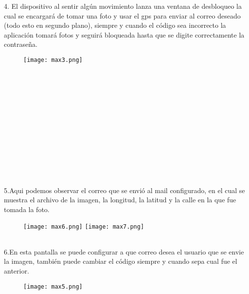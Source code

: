 \documentclass[12pt,letterpaper]{article}
\begin{document}
4. El dispositivo al sentir algún movimiento lanza una ventana de desbloqueo la cual se encargará de tomar una foto y usar el gps para enviar al correo deseado (todo esto en segundo plano), siempre y cuando el código sea incorrecto la aplicación tomará fotos y seguirá bloqueada hasta que se digite correctamente la contraseña.
\begin{figure}[h]
\begin{center}
\texttt{[image: max3.png]}\\
\end{center}
\end{figure}\\\\\\\\\\\\\\\\\\\\\\\\
5.Aqui podemos observar el correo que se envió al mail configurado, en el cual se muestra el archivo de la imagen, la longitud, la latitud y la calle en la que fue tomada la foto.
\begin{figure}[h]
\begin{center}
\texttt{[image: max6.png]}\hspace{2cm}
\texttt{[image: max7.png]}\\
\end{center}
\end{figure}\\
6.En esta pantalla se puede configurar a que correo desea el usuario que se envie la imagen, también puede cambiar el código siempre y cuando sepa cual fue el anterior.
\begin{figure}[h]
\begin{center}
\texttt{[image: max5.png]}\\
\end{center}
\end{figure}
\end{document}
